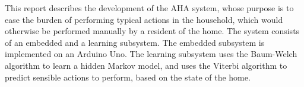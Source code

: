 \begin{center}
This report describes the development of the AHA system, whose purpose is to ease the burden of performing typical actions in the household, which would otherwise be performed manually by a resident of the home. The system consists of an embedded and a learning subsystem.  The embedded subsystem is implemented on an Arduino Uno. The learning subsystem uses the Baum-Welch algorithm to learn a hidden Markov model, and uses the Viterbi algorithm to predict sensible actions to perform, based on the state of the home.
\end{center}
